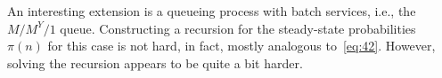 \documentclass[companion]{subfiles}
\begin{document}
\begin{extra}
 An interesting extension is a queueing process with batch services, i.e., the $M/M^Y/1$ queue.
 Constructing a recursion for the steady-state probabilities $\pi(n)$ for this case is not hard, in fact, mostly analogous to~\cref{eq:42}.
 However, solving the recursion appears to be quite a bit harder. 
\end{extra}



\end{document}
